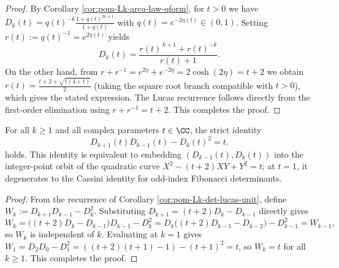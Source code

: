 \begin{proof}
By Corollary \ref{cor:pom-Lk-area-law-qform}, for \(t>0\) we have
\(
D_k(t)=q(t)^{-k}\frac{1+q(t)^{2k+1}}{1+q(t)}
\)
with \(q(t)=e^{-2\eta(t)}\in(0,1)\).
Setting \(r(t):=q(t)^{-1}=e^{2\eta(t)}\) yields
\[
D_k(t)=\frac{r(t)^{\,k+1}+r(t)^{-k}}{r(t)+1}.
\]
On the other hand, from \(r+r^{-1}=e^{2\eta}+e^{-2\eta}=2\cosh(2\eta)=t+2\) we obtain
\(
r(t)=\frac{t+2+\sqrt{t(4+t)}}{2}
\)
(taking the square root branch compatible with \(t>0\)), which gives the stated expression.
The Lucas recurrence follows directly from the first-order elimination using \(r+r^{-1}=t+2\). This completes the proof.
\end{proof}

\begin{proposition}\label{prop:pom-Lk-det-cassini-pell}
For all \(k\ge 1\) and all complex parameters \(t\in\CC\), the strict identity
\[
\boxed{\;
D_{k+1}(t)D_{k-1}(t)-D_k(t)^2=t.\;}
\]
holds. This identity is equivalent to embedding \((D_{k-1}(t),D_k(t))\) into the integer-point orbit of the quadratic curve
\(
X^2-(t+2)XY+Y^2=t
\);
at \(t=1\), it degenerates to the Cassini identity for odd-index Fibonacci determinants.
\end{proposition}
\begin{proof}
From the recurrence of Corollary \ref{cor:pom-Lk-det-lucas-unit}, define
\(
W_k:=D_{k+1}D_{k-1}-D_k^2
\).
Substituting \(D_{k+1}=(t+2)D_k-D_{k-1}\) directly gives
\[
W_k=\bigl((t+2)D_k-D_{k-1}\bigr)D_{k-1}-D_k^2
=D_k\bigl((t+2)D_{k-1}-D_{k-2}\bigr)-D_{k-1}^2
=W_{k-1},
\]
so \(W_k\) is independent of \(k\).
Evaluating at \(k=1\) gives
\(
W_1=D_2D_0-D_1^2=((t+2)(t+1)-1)- (t+1)^2=t
\), so \(W_k=t\) for all \(k\ge 1\). This completes the proof.
\end{proof}


